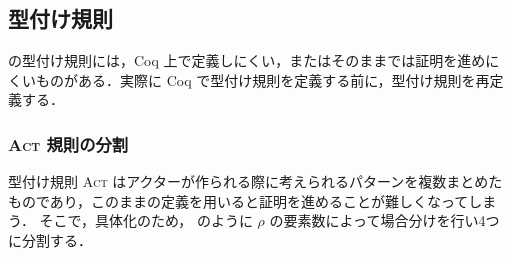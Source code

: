 








\subsection{型付け規則}


\api の型付け規則には，Coq 上で定義しにくい，またはそのままでは証明を進めにくいものがある．実際に Coq で型付け規則を定義する前に，型付け規則を再定義する．

\subsubsection{\textsc{Act} 規則の分割}

型付け規則 \textsc{Act} はアクターが作られる際に考えられるパターンを複数まとめたものであり，このままの定義を用いると証明を進めることが難しくなってしまう．
そこで，具体化のため， のように $\rho$ の要素数によって場合分けを行い4つに分割する．





